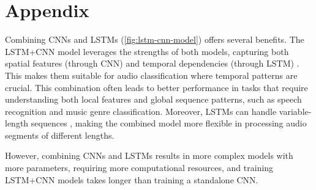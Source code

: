 \section{Appendix}
Combining CNNs and LSTMs (\autoref{fig:lstm-cnn-model}) offers several benefits. The LSTM+CNN model leverages
the strengths of both models, capturing both spatial features (through CNN) and
temporal dependencies (through LSTM) \cite{sainath2015convolutional}.
This makes them suitable for audio classification where temporal patterns are crucial.
This combination often leads to better performance in tasks that require understanding both
local features and global sequence patterns, such as speech recognition and music genre
classification. Moreover, LSTMs can handle variable-length sequences \cite{lim2020time},
making the combined model more flexible in processing audio segments of different lengths.

However, combining CNNs and LSTMs results in more complex models with more parameters,
requiring more computational resources, and training LSTM+CNN models takes longer than
training a standalone CNN.
